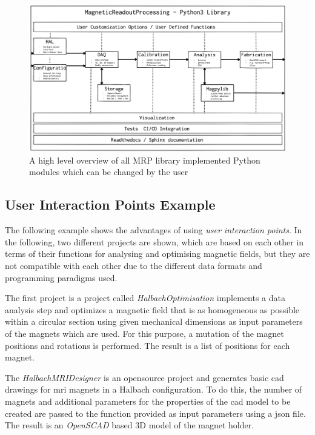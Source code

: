 \begin{figure}
\centering
\includegraphics{./generated_images/border_A_high_level_overview_of_all_MRP_library_implemented_Python_modules_which_can_be_changed_by_the_user.png}
\caption{A high level overview of all MRP library implemented Python
modules which can be changed by the user
\label{A_high_level_overview_of_all_MRP_library_implemented_Python_modules_which_can_be_changed_by_the_user.png}}
\end{figure}

\hypertarget{user-interaction-points-example}{%
\subsection{User Interaction Points
Example}\label{user-interaction-points-example}}

The following example shows the advantages of using \emph{user
interaction points}. In the following, two different projects are shown,
which are based on each other in terms of their functions for analysing
and optimising magnetic fields, but they are not compatible with each
other due to the different data formats and programming paradigms used.

The first project is a project called \emph{HalbachOptimisation}
 implements a data analysis step and optimizes a magnetic
field that is as homogeneous as possible within a circular section using
given mechanical dimensions as input parameters of the magnets which are
used. For this purpose, a mutation of the magnet positions and rotations
is performed. The result is a list of positions for each magnet.

The \emph{HalbachMRIDesigner}  is an opensource project
and generates basic \gls{cad} drawings for \gls{mri} magnets in a
Halbach configuration. To do this, the number of magnets and additional
parameters for the properties of the \gls{cad} model to be created are
passed to the function provided as input parameters using a \gls{json}
file. The result is an \emph{OpenSCAD}  based 3D model
of the magnet holder.

